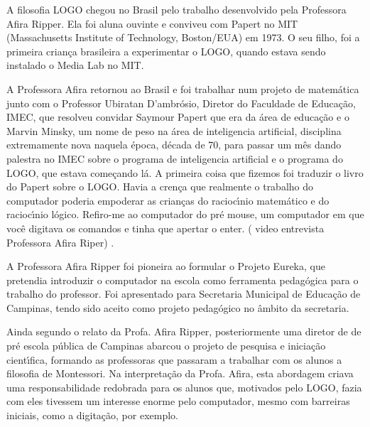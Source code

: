 \documentclass[
12pt,		%
openright,	%
twoside,  %
a4paper,			%
chapter=TITLE,		%
english,			%
french,				%
spanish,			%
brazil				%
]{USPSC-classe/USPSC_RedarTex}
\begin{document}
A filosofia LOGO chegou no Brasil pelo trabalho  desenvolvido pela Professora Afira Ripper. Ela foi aluna ouvinte e conviveu com Papert no MIT (Massachusetts Institute of Technology, Boston/EUA) em 1973. O seu filho, foi a primeira crian\c{c}a brasileira a experimentar o LOGO, quando estava sendo instalado o Media Lab no MIT.\textquotedbl 








A Professora Afira  retornou ao  Brasil e foi trabalhar num  projeto de matem\'atica junto com o Professor  Ubiratan D’ambr\'osio, Diretor do  Faculdade de Educa\c{c}\~ao, IMEC, que resolveu convidar Saymour Papert que era da \'area de educa\c{c}\~ao e o Marvin Minsky,  um nome de peso na \'area de inteligencia artificial, disciplina extremamente nova naquela \'epoca, d\'ecada de 70, para passar um m\^es dando palestra  no IMEC sobre o programa de inteligencia artificial e o programa do LOGO, que estava come\c{c}ando l\'a.  A primeira coisa que fizemos foi traduzir o livro do Papert sobre o LOGO.  Havia a cren\c{c}a que realmente o trabalho do computador  poderia empoderar as crian\c{c}as do racioc\'{\i}nio matem\'atico e do racioc\'{\i}nio l\'ogico. Refiro-me ao computador do pr\'e mouse, um computador  em que voc\^e digitava os comandos e tinha que apertar o enter. ( video entrevista Professora Afira Riper) .\textquotedbl 








A Professora Afira Ripper foi pioneira ao formular o Projeto Eureka, que pretendia introduzir o computador na escola como ferramenta pedag\'ogica para o trabalho do professor. Foi apresentado para  Secretaria Municipal de Educa\c{c}\~ao de Campinas, tendo sido aceito como projeto pedag\'ogico no \^ambito da secretaria.








Ainda segundo o relato da Profa. Afira Ripper, posteriormente uma diretor de de pr\'e escola p\'ublica de Campinas abarcou  o projeto de pesquisa e inicia\c{c}\~ao cient\'{\i}fica, formando as professoras que passaram a trabalhar com os alunos  a filosofia de Montessori. Na interpreta\c{c}\~ao da Profa. Afira, esta abordagem criava uma responsabilidade redobrada para os alunos que, motivados pelo LOGO, fazia com eles tivessem um interesse enorme pelo computador, mesmo com barreiras iniciais, como a digita\c{c}\~ao, por exemplo.
\end{document}

